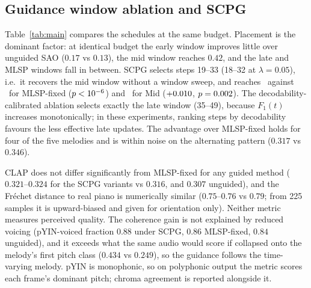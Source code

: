 \documentclass{article}
\renewcommand{\footnotesize}{\fontsize{9}{10.45}\selectfont}
\begin{document}
\begin{table}[t]
\centering\footnotesize
\caption{Test-set means; guided methods use $K{=}15$; $n{=}225$ except 224 valid MLSP-fixed coherence values (225 CLAP values; complete pairs for paired tests). Bootstrap 95\% CI half-widths $\leq0.035$ (coherence), $\leq0.017$ (CLAP). $^{+}$/$^{-}$: higher/lower coherence than MLSP-fixed (paired Wilcoxon, Holm $p<0.05$). MLSP-fixed: every second step from 20 to 48. FAD uses CLAP embeddings; \#u.: probe updates.}
\label{tab:main}

\end{table}

\subsection{Guidance window ablation and SCPG}
\label{sec:expB}
Table~\ref{tab:main} compares the schedules at the same budget. Placement is the dominant factor: at identical budget the early window improves little over unguided SAO ($0.17$ vs $0.13$), the mid window reaches $0.42$, and the late and MLSP windows fall in between. SCPG selects steps 19--33 (18--32 at $\lambda{=}0.05$), i.e.\ it recovers the mid window without a window sweep, and reaches \cohTopK\ against \cohMLSP\ for MLSP-fixed ($p<10^{-6}$) and \cohMid\ for Mid ($+0.010$, $p=0.002$). The decodability-calibrated ablation selects exactly the late window (35--49), because $F_1(t)$ increases monotonically; in these experiments, ranking steps by decodability favours the less effective late updates. The advantage over MLSP-fixed holds for four of the five melodies and is within noise on the alternating pattern ($0.317$ vs $0.346$).

CLAP does not differ significantly from MLSP-fixed for any guided method ($0.321$--$0.324$ for the SCPG variants vs $0.316$, and $0.307$ unguided), and the Fr\'echet distance to real piano is numerically similar ($0.75$--$0.76$ vs $0.79$; from 225 samples it is upward-biased and given for orientation only). Neither metric measures perceived quality. The coherence gain is not explained by reduced voicing (pYIN-voiced fraction $0.88$ under SCPG, $0.86$ MLSP-fixed, $0.84$ unguided), and it exceeds what the same audio would score if collapsed onto the melody's first pitch class ($0.434$ vs $0.249$), so the guidance follows the time-varying melody. pYIN is monophonic, so on polyphonic output the metric scores each frame's dominant pitch; chroma agreement is reported alongside it.
\end{document}

